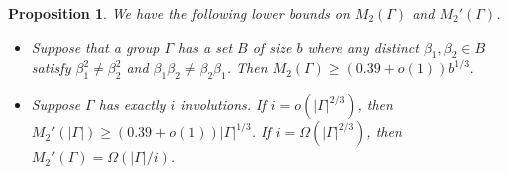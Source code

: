 \documentclass[12pt]{article}
\newtheorem{prop}{Proposition}
\begin{document}

\begin{prop} \label{Probabilistic constructions}
We have the following lower bounds on $M_2(\Gamma)$ and $M_2'(\Gamma)$.
\begin{itemize}
    \item[(a)] Suppose that a group $\Gamma$ has a set $B$ of size $b$ where any distinct $\beta_1,\beta_2\in B$ satisfy $\beta_1^2\ne\beta_2^2$ and $\beta_1\beta_2\ne\beta_2\beta_1$. Then $M_2(\Gamma)\ge(0.39+o(1))b^{1/3}.$
    \item[(b)] Suppose $\Gamma$ has exactly $i$ involutions. If $i=o(|\Gamma|^{2/3})$, then $M_2'(|\Gamma|)\ge (0.39+o(1))|\Gamma|^{1/3}$. If $i=\Omega(|\Gamma|^{2/3})$, then $M_2'(\Gamma)=\Omega(|\Gamma|/i)$.
\end{itemize}
\end{prop}
\end{document}
